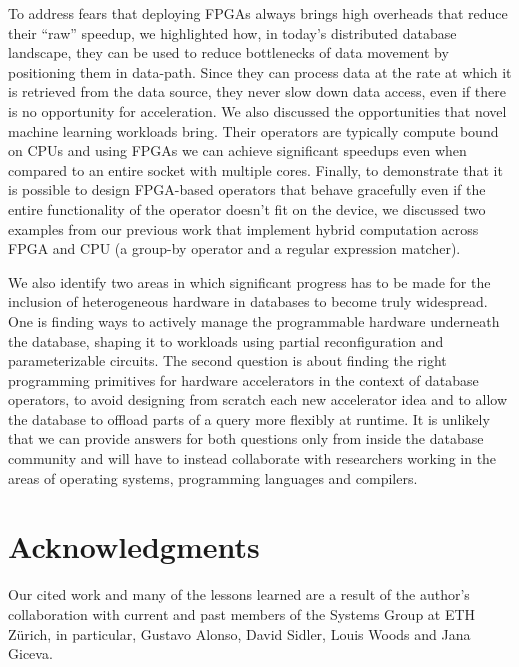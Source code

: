 \documentclass[11pt]{article}
\begin{document}
To address fears that deploying FPGAs always brings high overheads that reduce their ``raw'' speedup, we highlighted how, in today's distributed database landscape, they can be used to reduce bottlenecks of data movement by positioning them in data-path. Since they can process data at the rate at which it is retrieved from the data source, they never slow down data access, even if there is no opportunity for acceleration. We also discussed the opportunities that novel machine learning workloads bring. Their operators are typically compute bound on CPUs and using FPGAs we can achieve significant speedups even when compared to an entire socket with multiple cores. Finally, to demonstrate that it is possible to design FPGA-based operators that behave gracefully even if the entire functionality of the operator doesn't fit on the device, we discussed two examples from our previous work that implement hybrid computation across FPGA and CPU (a group-by operator and a regular expression matcher).

We also identify two areas in which significant progress has to be made for the inclusion of heterogeneous hardware in databases to become truly widespread. One is finding ways to actively manage the programmable hardware underneath the database, shaping it to workloads using partial reconfiguration and parameterizable circuits. The second question is about finding the right programming primitives for hardware accelerators in the context of database operators, to avoid designing from scratch each new accelerator idea and to allow the database to offload parts of a query more flexibly at runtime. It is unlikely that we can provide answers for both questions only from inside the database community and will have to instead collaborate with researchers working in the areas of operating systems, programming languages and compilers.

\small
\section*{Acknowledgments}

Our cited work and many of the lessons learned are a result of the author's collaboration with current and past members of the Systems Group at ETH Z\"{u}rich, in particular, Gustavo Alonso, David Sidler, Louis Woods and Jana Giceva.
\end{document}
